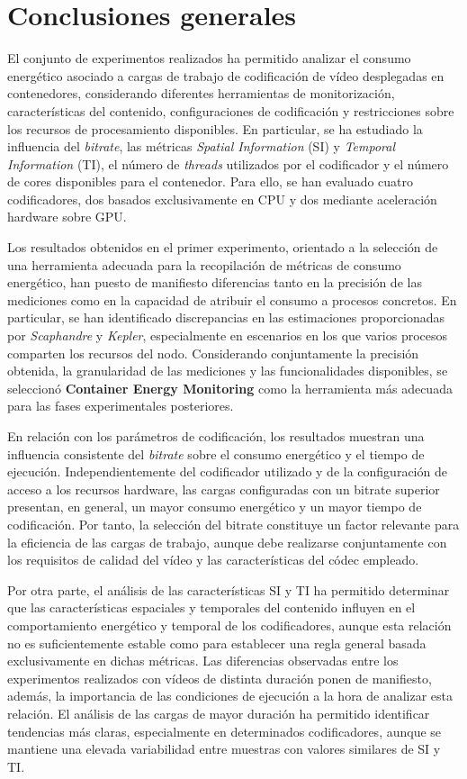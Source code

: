 \section{Conclusiones generales}

 El conjunto de experimentos realizados ha permitido analizar el consumo energético asociado a cargas de trabajo de codificación de vídeo desplegadas en contenedores, considerando diferentes herramientas de monitorización, características del contenido, configuraciones de codificación y restricciones sobre los recursos de procesamiento disponibles. En particular, se ha estudiado la influencia del \textit{bitrate}, las métricas \textit{Spatial Information} (SI) y \textit{Temporal Information} (TI), el número de \textit{threads} utilizados por el codificador y el número de cores disponibles para el contenedor. Para ello, se han evaluado cuatro codificadores, dos basados exclusivamente en CPU y dos mediante aceleración hardware sobre GPU. 

 Los resultados obtenidos en el primer experimento, orientado a la selección de una herramienta adecuada para la recopilación de métricas de consumo energético, han puesto de manifiesto diferencias tanto en la precisión de las mediciones como en la capacidad de atribuir el consumo a procesos concretos. En particular, se han identificado discrepancias en las estimaciones proporcionadas por \textit{Scaphandre} y \textit{Kepler}, especialmente en escenarios en los que varios procesos comparten los recursos del nodo. Considerando conjuntamente la precisión obtenida, la granularidad de las mediciones y las funcionalidades disponibles, se seleccionó \textbf{Container Energy Monitoring} como la herramienta más adecuada para las fases experimentales posteriores.

 En relación con los parámetros de codificación, los resultados muestran una influencia consistente del \textit{bitrate} sobre el consumo energético y el tiempo de ejecución. Independientemente del codificador utilizado y de la configuración de acceso a los recursos hardware, las cargas configuradas con un bitrate superior presentan, en general, un mayor consumo energético y un mayor tiempo de codificación. Por tanto, la selección del bitrate constituye un factor relevante para la eficiencia de las cargas de trabajo, aunque debe realizarse conjuntamente con los requisitos de calidad del vídeo y las características del códec empleado.

 Por otra parte, el análisis de las características SI y TI ha permitido determinar que las características espaciales y temporales del contenido influyen en el comportamiento energético y temporal de los codificadores, aunque esta relación no es suficientemente estable como para establecer una regla general basada exclusivamente en dichas métricas. Las diferencias observadas entre los experimentos realizados con vídeos de distinta duración ponen de manifiesto, además, la importancia de las condiciones de ejecución a la hora de analizar esta relación. El análisis de las cargas de mayor duración ha permitido identificar tendencias más claras, especialmente en determinados codificadores, aunque se mantiene una elevada variabilidad entre muestras con valores similares de SI y TI.


